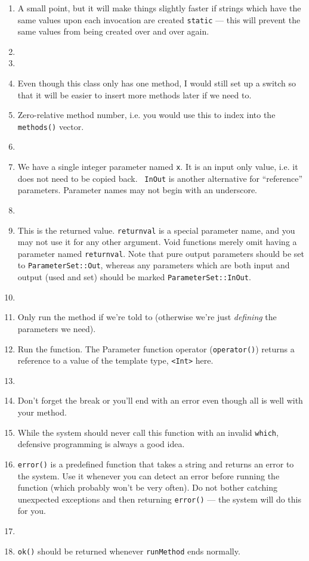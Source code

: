 \begin{enumerate}
    \item A small point, but it will make things slightly faster if strings
          which have the same values upon each invocation are created
          {\tt static} --- this will prevent the same values from being
          created over and over again.
    \item
    \item
    \item Even though this class only has one method, I would still set
          up a switch so that it will be easier to insert more methods
          later if we need to.
    \item Zero-relative method number, i.e. you would use this to index
          into the {\tt methods()} vector.
    \item
    \item We have a single integer parameter named {\tt x}. It is an
          input only value, i.e. it does not need to be copied back. {\tt
          InOut} is another alternative for ``reference''
          parameters. Parameter names may not begin with an underscore.
    \item
    \item This is the returned value. {\tt returnval} is a special
          parameter name, and you may not use it for any other
          argument. Void functions merely omit having a parameter named
          {\tt returnval}. Note that pure output parameters should be
          set to {\tt ParameterSet::Out}, whereas any parameters which
          are both input and output (used and set) should be marked
          {\tt ParameterSet::InOut}.
    \item
    \item Only run the method if we're told to (otherwise we're just
          {\em defining} the parameters we need).
    \item Run the function. The Parameter function operator 
          ({\tt operator()}) returns 
          a reference to
          a value of the template type, {\tt <Int>} here.
    \item 
    \item Don't forget the break or you'll end with an error even though all
          is well with your method.
    \item While the system should never call this function with an invalid
          {\tt which}, defensive programming is always a good idea.
    \item {\tt error()} is a predefined function that takes a string and
          returns an error to the system. Use it whenever you can detect
          an error before running the function (which probably won't be
          very often). Do not bother catching unexpected exceptions and then
          returning {\tt error()} --- the system will do this for you.
    \item
    \item {\tt ok()} should be returned whenever {\tt runMethod} ends
          normally.
\end{enumerate}

